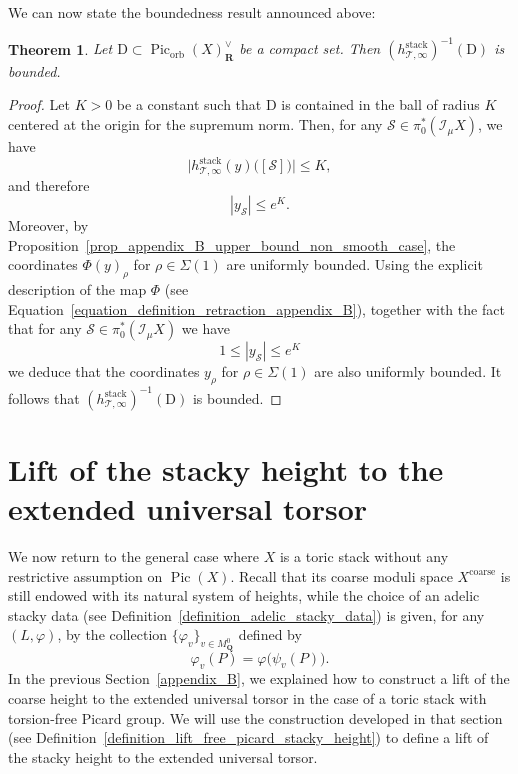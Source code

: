 \documentclass{proc-l}
\newcommand{\R}{\mathbf{R}}
\newcommand{\Q}{\mathbf{Q}}
\DeclareMathOperator{\Pic}{Pic}
\DeclareMathOperator{\stack}{stack}
\DeclareMathOperator{\coarse}{coarse}
\DeclareMathOperator{\orb}{orb}
\newcommand{\stackS}{\mathcal{S}}
\newcommand{\stackT}{\mathcal{T}}
\newcommand{\sheafI}{\mathcal{I}}
\newcommand{\twistsector}{\pi_0^*(\sheafI_{\mu} X)}
\newtheorem{theorem}{Theorem}[section]
\theoremstyle{definition}
\theoremstyle{remark}
\numberwithin{equation}{section}
\begin{document}
We can now state the boundedness result announced above:

\begin{theorem}\label{theorem_appendix_B_compacity_pull-back-compact_ext_height}
    Let $\mathrm{D} \subset \Pic_{\orb}(X)^{\vee}_{\R}$ be a compact set. Then $(h^{\stack}_{\stackT,\infty})^{-1}(\mathrm{D})$ is bounded.
\end{theorem}

\begin{proof}
Let $K > 0$ be a constant such that $\mathrm{D}$ is contained in the ball of radius $K$
centered at the origin for the supremum norm. Then, for any
$\stackS \in \twistsector$, we have
\[
\bigl| h^{\stack}_{\stackT,\infty}(y)\bigl([\stackS]\bigr) \bigr| \leqslant K,
\]
and therefore
\[
|y_{\stackS}| \leqslant e^{K}.
\]
Moreover, by Proposition~\ref{prop_appendix_B_upper_bound_non_smooth_case}, the coordinates
$\Phi(y)_{\rho}$ for $\rho \in \Sigma(1)$ are uniformly bounded. Using the explicit
description of the map $\Phi$ (see Equation~\eqref{equation_definition_retraction_appendix_B}), together with
the fact that for any $\stackS \in \twistsector$ we have $$1 \leqslant |y_{\stackS}| \leqslant e^K$$
we deduce that the coordinates $y_{\rho}$ for $\rho \in \Sigma(1)$ are also uniformly
bounded. It follows that $(h^{\stack}_{\stackT,\infty})^{-1}(\mathrm{D})$ is bounded.
\end{proof}








\section{Lift of the stacky height to the extended universal torsor}




We now return to the general case where $X$ is a toric stack without any restrictive assumption on $\Pic(X)$. Recall that its coarse moduli space $X^{\coarse}$ is still endowed with its natural system of heights, while the choice of an adelic stacky data (see Definition~\ref{definition_adelic_stacky_data}) is given, for any $(L,\varphi)$, by the collection $\{\varphi_v\}_{v \in M_{\Q}^0}$ defined by
\[
    \varphi_v(P) = \varphi\bigl(\psi_v(P)\bigr).
\]In the previous Section~\ref{appendix_B}, we explained how to construct a lift of the coarse height to the extended universal torsor in the case of a toric stack with torsion-free Picard group. We will use the construction developed in that section (see Definition~\ref{definition_lift_free_picard_stacky_height}) to define a lift of the stacky height to the extended universal torsor.
\end{document}
